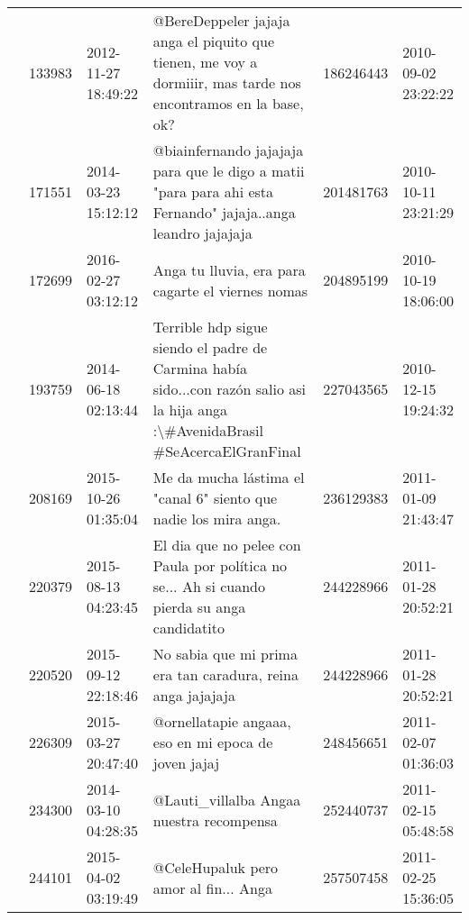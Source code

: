 \begin{tabular}{llllrl}
           & 133983  & 2012-11-27 18:49:22 &                                @BereDeppeler jajaja anga el piquito que tienen, me voy a dormiiir, mas tarde nos encontramos en la base, ok? &   186246443 & 2010-09-02 23:22:22 \\
           & 171551  & 2014-03-23 15:12:12 &                                 @biainfernando jajajaja para que le digo a matii "para para ahi esta Fernando" jajaja..anga leandro jajajaja &   201481763 & 2010-10-11 23:21:29 \\
           & 172699  & 2016-02-27 03:12:12 &                                                                                            Anga tu lluvia, era para cagarte el viernes nomas &   204895199 & 2010-10-19 18:06:00 \\
           & 193759  & 2014-06-18 02:13:44 &           Terrible hdp sigue siendo el padre de Carmina había sido...con razón salio asi la hija anga :\textbackslash \#AvenidaBrasil \#SeAcercaElGranFinal &   227043565 & 2010-12-15 19:24:32 \\
           & 208169  & 2015-10-26 01:35:04 &                                                                             Me da mucha lástima el "canal 6" siento que nadie los mira anga. &   236129383 & 2011-01-09 21:43:47 \\
           & 220379  & 2015-08-13 04:23:45 &                                                  El dia que no pelee con Paula por política no se... Ah si cuando pierda su anga candidatito &   244228966 & 2011-01-28 20:52:21 \\
           & 220520  & 2015-09-12 22:18:46 &                                                                                  No sabia que mi prima era tan caradura, reina anga jajajaja &   244228966 & 2011-01-28 20:52:21 \\
           & 226309  & 2015-03-27 20:47:40 &                                                                                         @ornellatapie angaaa, eso en mi epoca de joven jajaj &   248456651 & 2011-02-07 01:36:03 \\
           & 234300  & 2014-03-10 04:28:35 &                                                                                                     @Lauti\_villalba Angaa nuestra recompensa &   252440737 & 2011-02-15 05:48:58 \\
           & 244101  & 2015-04-02 03:19:49 &                                                                                                        @CeleHupaluk pero amor al fin... Anga &   257507458 & 2011-02-25 15:36:05 \\

\end{tabular}
